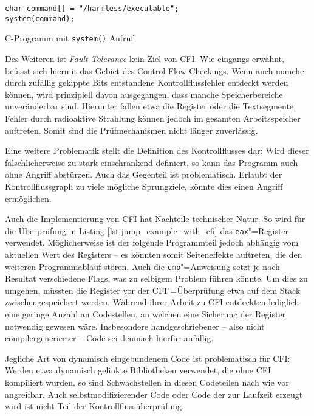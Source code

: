 \documentclass[12pt,%
               oneside,
               a4paper]{uiothesis}
\begin{document}
\begin{listing}
\begin{verbatim}
char command[] = "/harmless/executable";
system(command);
\end{verbatim}
\caption{C-Programm mit \texttt{system()} Aufruf}
\label{lst:c_system}
\end{listing}

Des Weiteren ist \emph{Fault Tolerance} kein Ziel von CFI. Wie eingangs erwähnt, befasst sich hiermit das Gebiet des Control Flow Checkings. Wenn auch manche durch zufällig gekippte Bits entstandene Kontrollflussfehler entdeckt werden können, wird prinzipiell davon ausgegangen, dass manche Speicherbereiche unveränderbar sind. Hierunter fallen etwa die Register oder die Textsegmente. Fehler durch radioaktive Strahlung können jedoch im gesamten Arbeitsspeicher auftreten. Somit sind die Prüfmechanismen nicht länger zuverlässig.

Eine weitere Problematik stellt die Definition des Kontrollflusses dar: Wird dieser fälschlicherweise zu stark einschränkend definiert, so kann das Programm auch ohne Angriff abstürzen. Auch das Gegenteil ist problematisch. Erlaubt der Kontrollflussgraph zu viele mögliche Sprungziele, könnte dies einen Angriff ermöglichen.


Auch die Implementierung von CFI hat Nachteile technischer Natur. So wird für die Überprüfung in Listing \ref{lst:jump_example_with_cfi} das \texttt{eax}"=Register verwendet. Möglicherweise ist der folgende Programmteil jedoch abhängig vom aktuellen Wert des Registers -- es könnten somit Seiteneffekte auftreten, die den weiteren Programmablauf stören. Auch die \texttt{cmp}"=Anweisung setzt je nach Resultat verschiedene Flags, was zu selbigem Problem führen könnte. Um dies zu umgehen, müssten die Register vor der CFI"=Überprüfung etwa auf dem Stack zwischengespeichert werden. Während ihrer Arbeit zu CFI entdeckten \cite{Abadi.2009} lediglich eine geringe Anzahl an Codestellen, an welchen eine Sicherung der Register notwendig gewesen wäre. Insbesondere handgeschriebener -- also nicht compilergenerierter -- Code sei demnach hierfür anfällig.

Jegliche Art von dynamisch eingebundenem Code ist problematisch für CFI: Werden etwa dynamisch gelinkte Bibliotheken verwendet, die ohne CFI kompiliert wurden, so sind Schwachstellen in diesen Codeteilen nach wie vor angreifbar. Auch selbstmodifizierender Code oder Code der zur Laufzeit erzeugt wird ist nicht Teil der Kontrollflussüberprüfung.
\end{document}

